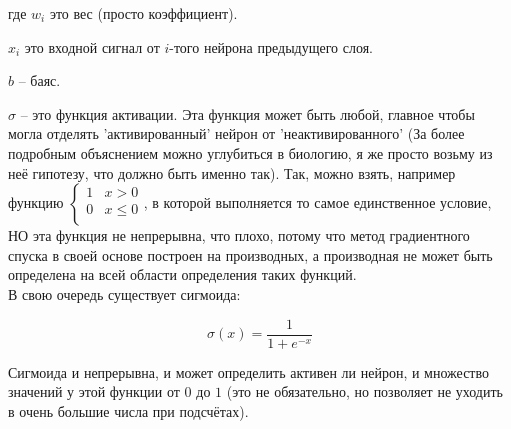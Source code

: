 \documentclass{article}
\begin{document}
        где $w_i$ это вес (просто коэффициент).
        
        $x_i$ это входной сигнал от $i$-того нейрона предыдущего слоя.
        
        $b$ -- баяс.

        $\sigma$ -- это функция активации.
        Эта функция может быть любой, главное чтобы могла отделять 'активированный'
        нейрон от 'неактивированного' (За более подробным объяснением можно
        углубиться в биологию, я же просто возьму из неё гипотезу, что должно
        быть именно так). Так, можно взять, например функцию
        $
            \begin{cases}
                1 & x > 0 \\
                0 & x \leq 0 \\
            \end{cases}
        $,
        в которой выполняется то самое единственное условие, НО
        эта функция не непрерывна, что плохо, потому что метод
        градиентного спуска в своей основе построен на 
        производных, а производная не может быть определена на
        всей области определения таких функций.\\

        В свою очередь существует сигмоида:
        

        \begin{figure}[H]
            \[\sigma(x) = \dfrac{1}{1+e^{-x}}\]
            \begin{center}
            \end{center}
        \end{figure}

        Сигмоида и непрерывна, и может определить активен ли нейрон, и множество
        значений у этой функции от $0$ до $1$ (это не обязательно, но позволяет
        не уходить в очень большие числа при подсчётах).
\end{document}
